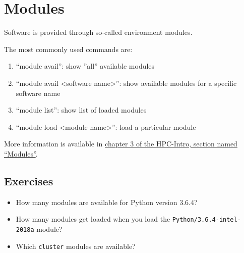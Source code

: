 \chapter{Modules}

Software is provided through so-called environment \gls{modules}.

The most commonly used commands are:

\begin{enumerate}
 \item ``module avail'': show ''all'' available modules
 \item ``module avail <software name>'': show available modules for a specific software name
 \item ``module list'': show list of loaded modules
 \item ``module load <module name>'': load a particular module
\end{enumerate}

More information is available in
\href{\HPCManualURL#sec:modules}{chapter 3 of the HPC-Intro, section named ``Modules''}.

\section{Exercises}

\begin{itemize}
    \item How many modules are available for Python version 3.6.4?
    \item How many modules get loaded when you load the \lstinline|Python/3.6.4-intel-2018a|
        module?
    \item Which \lstinline|cluster| modules are available?
\end{itemize}
